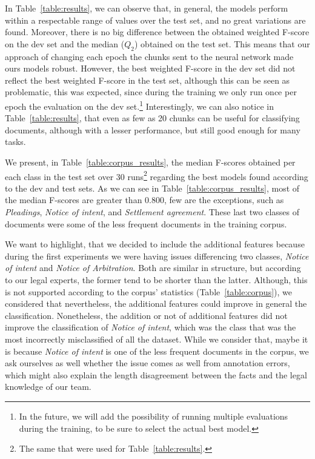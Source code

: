 \documentclass[11pt]{article}
\begin{document}
    In Table~\ref{table:results}, we can observe that, in general, the models perform within a respectable range of values over the test set, and no great variations are found. Moreover, there is no big difference between the obtained weighted F-score on the dev set and the median ($Q_2$) obtained on the test set. This means that our approach of changing each epoch the chunks sent to the neural network made ours models robust. However, the best weighted F-score in the dev set did not reflect the best weighted F-score in the test set, although this can be seen as problematic, this was expected, since during the training we only run once per epoch the evaluation on the dev set.\footnote{In the future, we will add the possibility of running multiple evaluations during the training, to be sure to select the actual best model.} Interestingly, we can also notice in Table~\ref{table:results}, that even as few as 20 chunks can be useful for classifying documents, although with a lesser performance, but still good enough for many tasks.

    We present, in Table~\ref{table:corpus_results}, the median F-scores obtained per each class in the test set over 30 runs\footnote{The same that were used for Table~\ref{table:results}.} regarding the best models found according to the dev and test sets. As we can see in Table~\ref{table:corpus_results}, most of the median F-scores are greater than 0.800, few are the exceptions, such as \textit{Pleadings}, \textit{Notice of intent}, and \textit{Settlement agreement}. These last two classes of documents were some of the less frequent documents in the training corpus. 

    We want to highlight, that we decided to include the additional features because during the first experiments we were having issues differencing two classes, \textit{Notice of intent} and \textit{Notice of Arbitration}. Both are similar in structure, but according to our legal experts, the former tend to be shorter than the latter. Although, this is not supported according to the corpus' statistics (Table~\ref{table:corpus}), we considered that nevertheless, the additional features could improve in general the classification. Nonetheless, the addition or not of additional features did not improve the classification of \textit{Notice of intent}, which was the class that was the most incorrectly misclassified of all the dataset. While we consider that, maybe it is because \textit{Notice of intent} is one of the less frequent documents in the corpus, we ask ourselves as well whether the issue comes as well from annotation errors, which might also explain the length disagreement between the facts and the legal knowledge of our team. 
\end{document}
